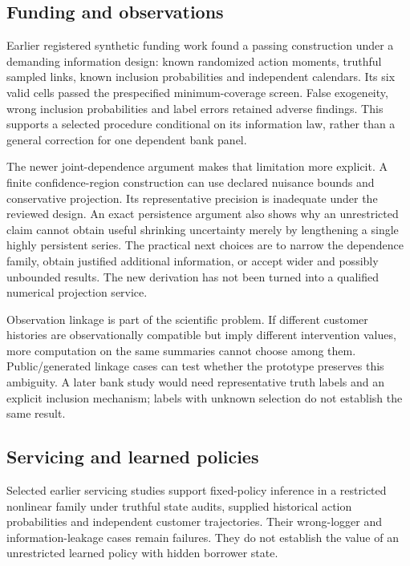 \hypertarget{funding-and-observations}{%
\subsection{Funding and observations}\label{funding-and-observations}}

Earlier registered synthetic funding work found a passing construction
under a demanding information design: known randomized action moments,
truthful sampled links, known inclusion probabilities and independent
calendars. Its six valid cells passed the prespecified minimum-coverage
screen. False exogeneity, wrong inclusion probabilities and label errors
retained adverse findings. This supports a selected procedure
conditional on its information law, rather than a general correction for
one dependent bank panel. \citep{sp13_funding}

The newer joint-dependence argument makes that limitation more explicit.
A finite confidence-region construction can use declared nuisance bounds
and conservative projection. Its representative precision is inadequate
under the reviewed design. An exact persistence argument also shows why
an unrestricted claim cannot obtain useful shrinking uncertainty merely
by lengthening a single highly persistent series. The practical next
choices are to narrow the dependence family, obtain justified additional
information, or accept wider and possibly unbounded results. The new
derivation has not been turned into a qualified numerical projection
service. \citep{sp13_persistence}

Observation linkage is part of the scientific problem. If different
customer histories are observationally compatible but imply different
intervention values, more computation on the same summaries cannot
choose among them. Public/generated linkage cases can test whether the
prototype preserves this ambiguity. A later bank study would need
representative truth labels and an explicit inclusion mechanism; labels
with unknown selection do not establish the same result.
\citep{sp13_public,sp13_persistence}

\hypertarget{servicing-and-learned-policies}{%
\subsection{Servicing and learned
policies}\label{servicing-and-learned-policies}}

Selected earlier servicing studies support fixed-policy inference in a
restricted nonlinear family under truthful state audits, supplied
historical action probabilities and independent customer trajectories.
Their wrong-logger and information-leakage cases remain failures. They
do not establish the value of an unrestricted learned policy with hidden
borrower state. \citep{sp13_servicing}

